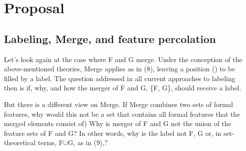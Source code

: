 \documentclass[output=paper
,modfonts
,nonflat]{langsci/langscibook}
\begin{document}
\section{Proposal}
\subsection{Labeling, Merge, and feature percolation}
Let’s look again at the case where F and G merge. Under the conception of the above-mentioned theories, Merge applies as in (8), leaving a position (\ul{}) to be filled by a label. The question addressed in all current approaches to labeling then is if, why, and how the merger of F and G, \{F, G\}, should receive a label.

\begin{figure}
	\begin{exe}
	\end{exe}
\end{figure}
\noindent But there is a different view on Merge. If Merge combines two sets of formal features, why would this not be a set that contains all formal features that the merged elements consist of) Why is merger of F and G not the union of the feature sets of F and G? In other words, why is the label not F, G or, in set-theoretical terms, F$\cup$G, as in (9),?
\end{document}
